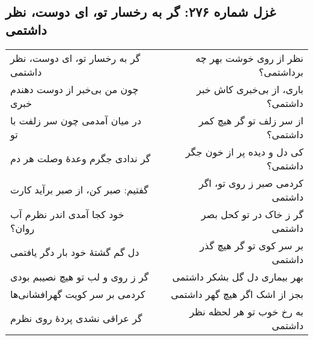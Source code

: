 \begin{center}
\section*{غزل شماره ۲۷۶: گر به رخسار تو، ای دوست، نظر داشتمی}
\label{sec:276}
\begin{longtable}{l p{0.5cm} r}
گر به رخسار تو، ای دوست، نظر داشتمی
&&
نظر از روی خوشت بهر چه برداشتمی؟
\\
چون من بی‌خبر از دوست دهندم خبری
&&
باری، از بی‌خبری کاش خبر داشتمی؟
\\
در میان آمدمی چون سر زلفت با تو
&&
از سر زلف تو گر هیچ کمر داشتمی؟
\\
گر ندادی جگرم وعدهٔ وصلت هر دم
&&
کی دل و دیده پر از خون جگر داشتمی؟
\\
گفتیم: صبر کن، از صبر برآید کارت
&&
کردمی صبر ز روی تو، اگر داشتمی
\\
خود کجا آمدی اندر نظرم آب روان؟
&&
گر ز خاک در تو کحل بصر داشتمی
\\
دل گم گشتهٔ خود بار دگر یافتمی
&&
بر سر کوی تو گر هیچ گذر داشتمی
\\
گر ز روی و لب تو هیچ نصیبم بودی
&&
بهر بیماری دل گل بشکر داشتمی
\\
کردمی بر سر کویت گهرافشانی‌ها
&&
بجز از اشک اگر هیچ گهر داشتمی
\\
گر عراقی نشدی پردهٔ روی نظرم
&&
به رخ خوب تو هر لحظه نظر داشتمی
\\
\end{longtable}
\end{center}
